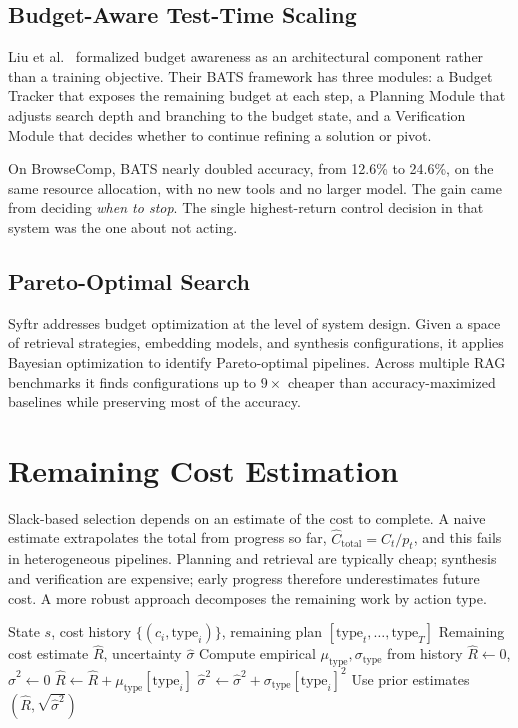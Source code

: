 \documentclass[11pt]{book}
\begin{document}
\subsection{Budget-Aware Test-Time Scaling}

Liu et al.\ \cite{liu2025bats} formalized budget awareness as an architectural component rather than a training objective. Their BATS framework has three modules: a Budget Tracker that exposes the remaining budget at each step, a Planning Module that adjusts search depth and branching to the budget state, and a Verification Module that decides whether to continue refining a solution or pivot.

On BrowseComp, BATS nearly doubled accuracy, from 12.6\% to 24.6\%, on the same resource allocation, with no new tools and no larger model. The gain came from deciding \textit{when to stop}. The single highest-return control decision in that system was the one about not acting.

\subsection{Pareto-Optimal Search}

Syftr \cite{dey2025syftr} addresses budget optimization at the level of system design. Given a space of retrieval strategies, embedding models, and synthesis configurations, it applies Bayesian optimization to identify Pareto-optimal pipelines. Across multiple RAG benchmarks it finds configurations up to $9\times$ cheaper than accuracy-maximized baselines while preserving most of the accuracy.

\section{Remaining Cost Estimation}

Slack-based selection depends on an estimate of the cost to complete. A naive estimate extrapolates the total from progress so far, $\hat{C}_{\text{total}} = C_t / p_t$, and this fails in heterogeneous pipelines. Planning and retrieval are typically cheap; synthesis and verification are expensive; early progress therefore underestimates future cost. A more robust approach decomposes the remaining work by action type.

\begin{algorithm}
\caption{Type-Aware Remaining Cost Estimation}
\begin{algorithmic}[1]
\Require State $s$, cost history $\{(c_i, \text{type}_i)\}$, remaining plan $[\text{type}_t, \ldots, \text{type}_T]$
\Ensure Remaining cost estimate $\hat{R}$, uncertainty $\hat{\sigma}$
\State Compute empirical $\mu_{\text{type}}, \sigma_{\text{type}}$ from history
\State $\hat{R} \gets 0$, $\hat{\sigma}^2 \gets 0$
        \State $\hat{R} \gets \hat{R} + \mu_{\text{type}}[\text{type}_i]$
        \State $\hat{\sigma}^2 \gets \hat{\sigma}^2 + \sigma_{\text{type}}[\text{type}_i]^2$
    \Else
        \State Use prior estimates
    \EndIf
\EndFor
\State \Return $(\hat{R}, \sqrt{\hat{\sigma}^2})$
\end{algorithmic}
\end{algorithm}
\end{document}
